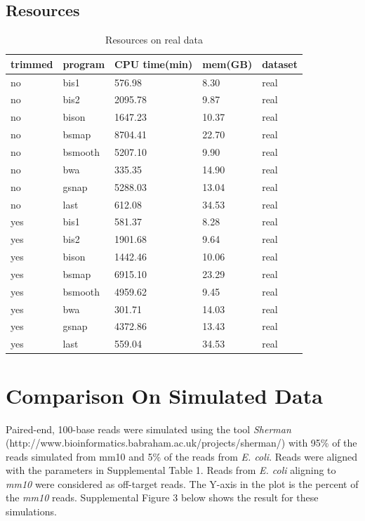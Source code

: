 \documentclass[12pt]{article}
\begin{document}
\subsection{Resources}

\begin{table}[H]
    \centering
    \caption{Resources on real data}
    \begin{tabular}{lllll} \hline
    trimmed & program & CPU time(min) & mem(GB) & dataset \\ \hline

no &    bis1 & 576.98 & 8.30 & real \\
no &    bis2 & 2095.78 & 9.87 & real \\
no &    bison & 1647.23 & 10.37 & real \\
no &    bsmap & 8704.41 & 22.70 & real \\
no &    bsmooth & 5207.10 & 9.90 & real \\
no &    bwa & 335.35 & 14.90 & real \\
no &    gsnap & 5288.03 & 13.04 & real \\
no &    last & 612.08 & 34.53 & real \\

yes &    bis1 & 581.37 & 8.28 & real \\
yes &    bis2 & 1901.68 & 9.64 & real \\
yes &    bison & 1442.46 & 10.06 & real \\
yes &    bsmap & 6915.10 & 23.29 & real \\
yes &    bsmooth & 4959.62 & 9.45 & real \\
yes &    bwa & 301.71 & 14.03 & real \\
yes &    gsnap & 4372.86 & 13.43 & real \\
yes &    last & 559.04 & 34.53 & real \\


    \end{tabular}
\end{table}

\section{Comparison On Simulated Data}
Paired-end, 100-base reads were simulated using the tool \emph{Sherman} (http://www.bioinformatics.babraham.ac.uk/projects/sherman/) with 95\% of the reads simulated from mm10 and 5\% of the reads from \emph{E. coli}. 
Reads were aligned with the parameters in Supplemental Table 1. Reads from \emph{E. coli} aligning to \emph{mm10}
were considered as off-target reads. The Y-axis in the plot is the percent of the \emph{mm10} reads.
Supplemental Figure 3 below shows the result for these simulations.
\end{document}
